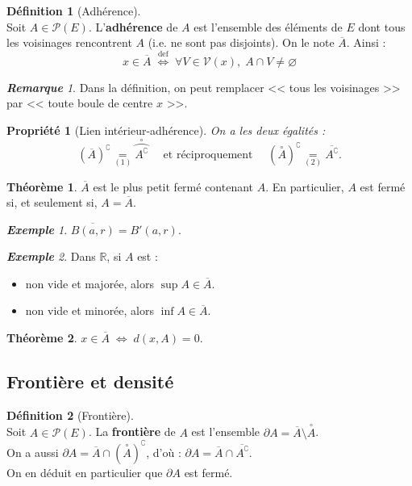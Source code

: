 \documentclass[12pt]{book}
\let\ensembleNombre\mathbb
\newcommand*\R{\ensuremath{\ensembleNombre{R}}}
\newcommand{\interieur}[1]{\ensuremath{\overset{\circ\!}{#1}}}
\newtheorem*{prop}{Propriété}
\theoremstyle{definition}
\newtheorem*{defi}{Définition}
\newtheorem{thme}{Théorème}[chapter]
\theoremstyle{remark}
\newtheorem*{rem}{\textbf{Remarque}}
\newtheorem*{ex}{\textbf{Exemple}}
\newenvironment{fdef}
  {\begin{mdframed}[roundcorner=10pt, linewidth=1pt]\begin{defi}}
  {\end{defi}\end{mdframed}}
\newenvironment{fthme}
  {\begin{mdframed}[roundcorner=10pt, linewidth=2pt]\begin{thme}}
  {\end{thme}\end{mdframed}}
\begin{document}
	\begin{fdef}[Adhérence]\mbox{~}\\
	Soit $A \in \mathcal P(E)$. L'\textbf{adhérence} de $A$ est l'ensemble des éléments de $E$ dont tous les voisinages rencontrent $A$ (i.e. ne sont pas disjoints). On le note $\overline A$. Ainsi :
	\[ x \in \overline A \; \overset{\mathrm{def}}{\Longleftrightarrow} \; \forall V \in \mathcal V(x),\; A \cap V \neq \varnothing \]
	\end{fdef}
	
	\begin{rem}
	Dans la définition, on peut remplacer << tous les voisinages >> par << toute boule de centre $x$ >>.
	\end{rem}
	
	\begin{prop}[Lien intérieur-adhérence]
	On a les deux égalités :
	\[\boxed{ \left( \overline{A} \right) ^\complement \underset{(1)}{=} \interieur{\wideparen{A^\complement}} \quad\text{ et réciproquement }\quad \left( \interieur A \right) ^\complement \underset{(2)}{=} \overline{A^\complement}.} \]
	\end{prop}
	
	\begin{fthme}
	$\overline A$ est le plus petit fermé contenant $A$. En particulier, $A$ est fermé si, et seulement si, $A = \overline A$.
	\end{fthme}
	
	\begin{ex}
	$\overline{B(a,r)} = B'(a,r).$
	\end{ex}
	
	\begin{ex}
	Dans $\R$, si $A$ est :
	\begin{itemize}
	\item non vide et majorée, alors $\sup A \in \overline A$.
	\item non vide et minorée, alors $\inf A \in \overline A$.
	\end{itemize}
	\end{ex}
	
	\begin{fthme}
	$x \in \overline A \; \Longleftrightarrow \; d(x,A) = 0$.
	\end{fthme}
	
	\subsection{Frontière et densité}
	\begin{fdef}[Frontière]\mbox{~}\\
	Soit $A \in \mathcal P(E)$. La \textbf{frontière} de $A$ est l'ensemble $\partial A = \overline A \setminus \interieur A$.\\	
	On a aussi $\partial A = \overline A \cap \left( \interieur A \right) ^\complement$, d'où : $\boxed{ \partial A = \overline A \cap \overline{A^\complement}. }$\\	
	On en déduit en particulier que $\partial A$ est fermé.
	\end{fdef}
	
\end{document}
